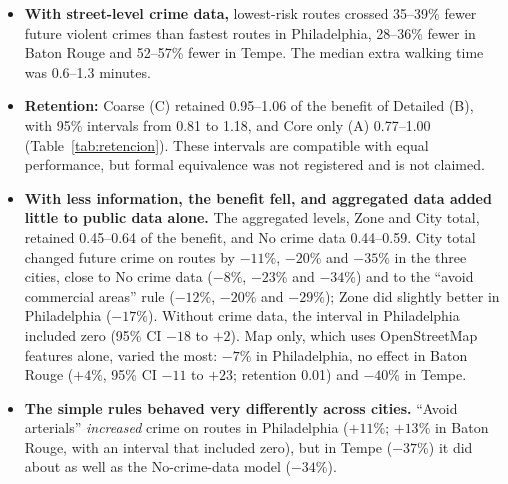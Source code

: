 \documentclass[preprint,12pt,authoryear]{elsarticle}
\begin{document}
\begin{itemize}
  \item \textbf{With street-level crime data,} lowest-risk routes crossed 35--39\% fewer future violent crimes than fastest routes in Philadelphia, 28--36\% fewer in Baton Rouge and 52--57\% fewer in Tempe. The median extra walking time was 0.6--1.3 minutes.
  \item \textbf{Retention:} Coarse (C) retained 0.95--1.06 of the benefit of Detailed (B), with 95\% intervals from 0.81 to 1.18, and Core only (A) 0.77--1.00 (Table~\ref{tab:retencion}). These intervals are compatible with equal performance, but formal equivalence was not registered and is not claimed.
  \item \textbf{With less information, the benefit fell, and aggregated data added little to public data alone.} The aggregated levels, Zone and City total, retained 0.45--0.64 of the benefit, and No crime data 0.44--0.59. City total changed future crime on routes by $-11\%$, $-20\%$ and $-35\%$ in the three cities, close to No crime data ($-8\%$, $-23\%$ and $-34\%$) and to the ``avoid commercial areas'' rule ($-12\%$, $-20\%$ and $-29\%$); Zone did slightly better in Philadelphia ($-17\%$). Without crime data, the interval in Philadelphia included zero (95\% CI $-18$ to $+2$). Map only, which uses OpenStreetMap features alone, varied the most: $-7\%$ in Philadelphia, no effect in Baton Rouge ($+4\%$, 95\% CI $-11$ to $+23$; retention 0.01) and $-40\%$ in Tempe.
  \item \textbf{The simple rules behaved very differently across cities.} ``Avoid arterials'' \emph{increased} crime on routes in Philadelphia ($+11\%$; $+13\%$ in Baton Rouge, with an interval that included zero), but in Tempe ($-37\%$) it did about as well as the No-crime-data model ($-34\%$).
\end{itemize}

\begin{table}[htbp]
\centering\small
\caption{Change in future core incidents on lowest-risk vs.\ fastest routes, \% (95\% CI), over trips where the router offered a lowest-risk route (38--67\% of trips for the crime-by-street levels).}
\label{tab:rutas}

\end{table}

\begin{table}[htbp]
\centering\small
\caption{Retention of the Detailed (B) benefit: route change of each level divided by that of Detailed (B), on the same trips (95\% CI).}
\label{tab:retencion}

\end{table}
\end{document}
